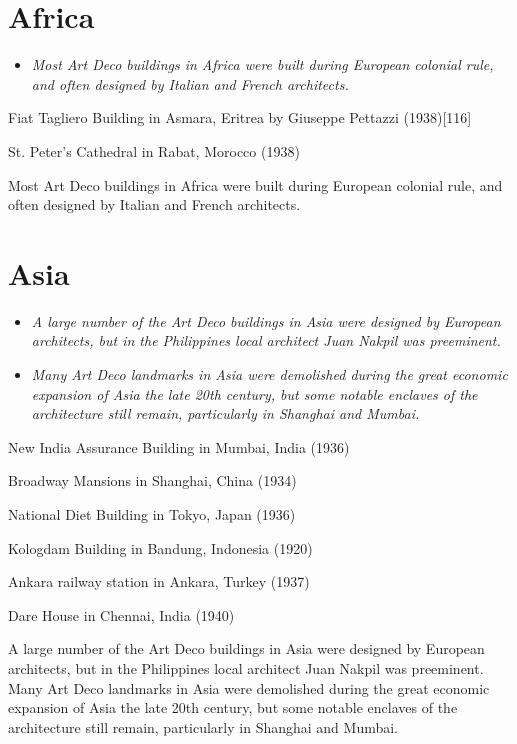 \section{Africa}\label{africa}

\begin{itemize}
\item
  \emph{Most Art Deco buildings in Africa were built during European
  colonial rule, and often designed by Italian and French architects.}
\end{itemize}

Fiat Tagliero Building in Asmara, Eritrea by Giuseppe Pettazzi
(1938){[}116{]}

St. Peter's Cathedral in Rabat, Morocco (1938)

Most Art Deco buildings in Africa were built during European colonial
rule, and often designed by Italian and French architects.

\section{Asia}\label{asia}

\begin{itemize}
\item
  \emph{A large number of the Art Deco buildings in Asia were designed
  by European architects, but in the Philippines local architect Juan
  Nakpil was preeminent.}
\item
  \emph{Many Art Deco landmarks in Asia were demolished during the great
  economic expansion of Asia the late 20th century, but some notable
  enclaves of the architecture still remain, particularly in Shanghai
  and Mumbai.}
\end{itemize}

New India Assurance Building in Mumbai, India (1936)

Broadway Mansions in Shanghai, China (1934)

National Diet Building in Tokyo, Japan (1936)

Kologdam Building in Bandung, Indonesia (1920)

Ankara railway station in Ankara, Turkey (1937)

Dare House in Chennai, India (1940)

A large number of the Art Deco buildings in Asia were designed by
European architects, but in the Philippines local architect Juan Nakpil
was preeminent. Many Art Deco landmarks in Asia were demolished during
the great economic expansion of Asia the late 20th century, but some
notable enclaves of the architecture still remain, particularly in
Shanghai and Mumbai.

